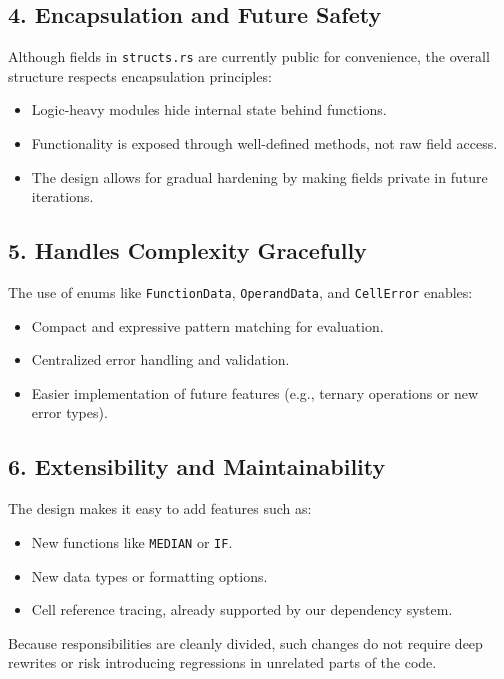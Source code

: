 \documentclass{article}
\begin{document}
\subsection*{4. Encapsulation and Future Safety}

Although fields in \texttt{structs.rs} are currently public for convenience, the overall structure respects encapsulation principles:
\begin{itemize}
    \item Logic-heavy modules hide internal state behind functions.
    \item Functionality is exposed through well-defined methods, not raw field access.
    \item The design allows for gradual hardening by making fields private in future iterations.
\end{itemize}

\subsection*{5. Handles Complexity Gracefully}

The use of enums like \texttt{FunctionData}, \texttt{OperandData}, and \texttt{CellError} enables:
\begin{itemize}
    \item Compact and expressive pattern matching for evaluation.
    \item Centralized error handling and validation.
    \item Easier implementation of future features (e.g., ternary operations or new error types).
\end{itemize}

\subsection*{6. Extensibility and Maintainability}

The design makes it easy to add features such as:
\begin{itemize}
    \item New functions like \texttt{MEDIAN} or \texttt{IF}.
    \item New data types or formatting options.
    \item Cell reference tracing, already supported by our dependency system.
\end{itemize}

Because responsibilities are cleanly divided, such changes do not require deep rewrites or risk introducing regressions in unrelated parts of the code.
\end{document}

